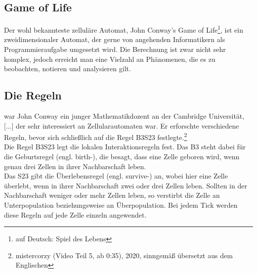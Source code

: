 \documentclass[12pt]{article}
\begin{document}
\subsection{Game of Life}
	Der wohl bekannteste zelluläre Automat, \glqq John Conway's Game of Life\grqq{}\footnote{auf Deutsch: \glqq Spiel des Lebens\grqq{}}, ist ein zweidimensionaler Automat, der gerne von angehenden Informatikern als Programmieraufgabe umgesetzt wird.
	Die Berechnung ist zwar nicht sehr komplex, jedoch erreicht man eine Vielzahl an Phänomenen, die es zu beobachten, notieren und analysieren gilt.
\subsection{Die Regeln}
	 war John Conway ein junger Mathematikdozent an der Cambridge Universität, [...] der sehr interessiert an Zellularautomaten war. Er erforschte verschiedene Regeln, bevor sich schließlich auf die Regel \glqq B3S23\grqq{} festlegte.\grqq{}\footnote{mistercorzy (Video Teil 5, ab 0:35), 2020, sinngemäß übersetzt aus dem Englischen}\\
	Die Regel B3S23 legt die lokalen Interaktionsregeln fest. Das B3 steht dabei für die Geburtsregel (engl. \glqq birth-\grqq{}),  die besagt, dass eine Zelle \glqq geboren\grqq{} wird, wenn genau drei Zellen in ihrer Nachbarschaft leben.\\
	Das S23 gibt die Überlebensregel (engl. \glqq survive-\grqq{}) an, wobei hier eine Zelle überlebt, wenn in ihrer Nachbarschaft zwei oder drei Zellen leben. Sollten in der Nachbarschaft weniger oder mehr Zellen leben, so verstirbt die Zelle an Unterpopulation beziehungsweise an Überpopulation. Bei jedem Tick werden diese Regeln auf jede Zelle einzeln angewendet.
\end{document}

